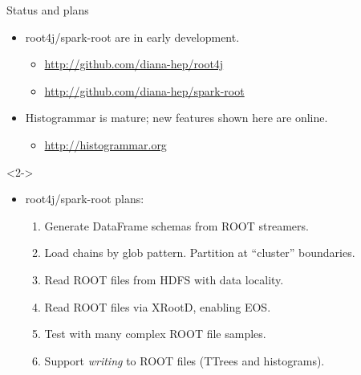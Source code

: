 \documentclass{beamer}
\begin{document}
\begin{frame}{Status and plans}
\vspace{0.25 cm}
\begin{itemize}
\item root4j/spark-root are in early development.
\begin{itemize}
\item \textcolor{blue}{\url{http://github.com/diana-hep/root4j}}
\item \textcolor{blue}{\url{http://github.com/diana-hep/spark-root}}
\end{itemize}

\item Histogrammar is mature; new features shown here are online.
\begin{itemize}
\item \textcolor{blue}{\url{http://histogrammar.org}}
\end{itemize}
\end{itemize}

\vspace{0.25 cm}
\begin{uncoverenv}<2->
\begin{itemize}
\item root4j/spark-root plans:
\begin{enumerate}
\item Generate DataFrame schemas from ROOT streamers.
\item Load chains by glob pattern. Partition at ``cluster'' boundaries.
\item Read ROOT files from HDFS with data locality.
\item Read ROOT files via XRootD, enabling EOS.
\item Test with many complex ROOT file samples.
\item Support {\it writing} to ROOT files (TTrees and histograms).
\end{enumerate}
\end{itemize}
\end{uncoverenv}
\end{frame}
\end{document}
